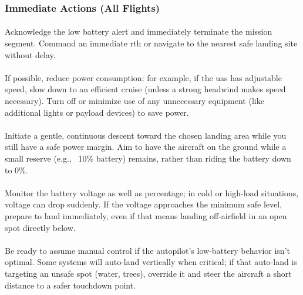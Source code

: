             \subsubsection{Immediate Actions (All Flights)}
            
                \paragraph{} Acknowledge the low battery alert and immediately terminate the mission segment. Command an immediate \ac{rth} or navigate to the nearest safe landing site without delay.
                
                \paragraph{} If possible, reduce power consumption: for example, if the \ac{uas} has adjustable speed, slow down to an efficient cruise (unless a strong headwind makes speed necessary). Turn off or minimize use of any unnecessary equipment (like additional lights or payload devices) to save power.
                
                \paragraph{} Initiate a gentle, continuous descent toward the chosen landing area while you still have a safe power margin. Aim to have the aircraft on the ground while a small reserve (e.g., ~10\% battery) remains, rather than riding the battery down to 0\%.
                
                \paragraph{} Monitor the battery voltage as well as percentage; in cold or high-load situations, voltage can drop suddenly. If the voltage approaches the minimum safe level, prepare to land immediately, even if that means landing off-airfield in an open spot directly below.
                
                \paragraph{} Be ready to assume manual control if the autopilot’s low-battery behavior isn’t optimal. Some systems will auto-land vertically when critical; if that auto-land is targeting an unsafe spot (water, trees), override it and steer the aircraft a short distance to a safer touchdown point.
                
